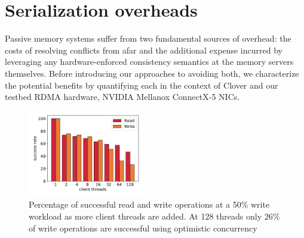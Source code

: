 \section{Serialization overheads}




Passive memory systems suffer from two fundamental sources of
overhead: the costs of resolving conflicts from afar and the
additional expense incurred by leveraging any hardware-enforced
consistency semantics at the memory servers themselves.  Before
introducing our approaches to avoiding both, we characterize the
potential benefits by quantifying each in the context of Clover and
our testbed RDMA hardware, NVIDIA Mellanox ConnectX-5 NICs.




\begin{figure}[t]
    \includegraphics[width=0.45\textwidth]{fig/success_rate.pdf}
    
    \caption{Percentage of successful read and write operations at a 50\% write
    workload as more client threads are added. At 128 threads only 26\% of write
    operations are successful using optimistic concurrency}

    \label{fig:success_rate}
\end{figure}

